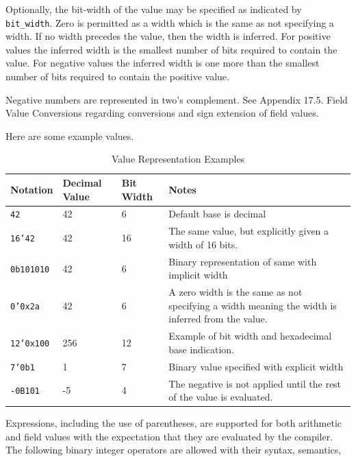 \documentclass[12pt]{article}
\begin{document}
Optionally, the bit-width of the value may be specified as indicated
by \texttt{bit_width}.  Zero is permitted as a width which is the
same as not specifying a width.  If no width precedes the value, then
the width is inferred. For positive values the inferred width is the
smallest number of bits required to contain the value. For negative
values the inferred width is one more than the smallest number of bits
required to contain the positive value.

Negative numbers are represented in two's complement. See Appendix 17.5. 
Field Value Conversions regarding conversions and sign extension of field 
values.

Here are some example values.

\begin{table}[H]
\begin{center}
\begin{tabular}{| l | l | l | p{} |} \hline
\textbf{Notation} &
\textbf{Decimal Value} & 
\textbf{Bit Width} &
\textbf{Notes} \\ \hline
\texttt{42} &
42 &
6 &
Default base is decimal \\ \hline
\texttt{16'42} &
42 &
16 &
The same value, but explicitly given a width of 16 bits. \\ \hline
\texttt{0b101010} &
42 &
6 &
Binary representation of same with implicit width \\ \hline
\texttt{0'0x2a} &
42 &
6 &
A zero width is the same as not specifying a width meaning the width is inferred from the value.   \\ \hline
\texttt{12'0x100} &
256 &
12 &
Example of bit width and hexadecimal base indication. \\ \hline
\texttt{7'0b1} &
1 &
7 &
Binary value specified with explicit width \\ \hline
\texttt{-0B101} &
-5 &
4 &
The negative is not applied until the rest of the value is evaluated. \\ \hline
\end{tabular}
\end{center}
\caption{Value Representation Examples}
\end{table}

\vspace{3mm}
Expressions, including the use of parentheses, are supported for both
arithmetic and field values with the expectation that they are
evaluated by the compiler.  The following binary integer operators are
allowed with their syntax, semantics,
 
\end{document}
